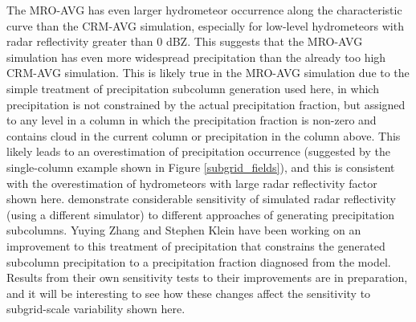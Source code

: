 \documentclass[letter]{article}
\begin{document}
The MRO-AVG has even larger hydrometeor occurrence along the characteristic curve than the CRM-AVG simulation, especially for low-level hydrometeors with radar reflectivity greater than $0$ dBZ. This suggests that the MRO-AVG simulation has even more widespread precipitation than the already too high CRM-AVG simulation. This is likely true in the MRO-AVG simulation due to the simple treatment of precipitation subcolumn generation used here, in which precipitation is not constrained by the actual precipitation fraction, but assigned to any level in a column in which the precipitation fraction is non-zero and contains cloud in the current column or precipitation in the column above. This likely leads to an overestimation of precipitation occurrence (suggested by the single-column example shown in Figure \ref{subgrid_fields}), and this is consistent with the overestimation of hydrometeors with large radar reflectivity factor shown here. \cite{dimichele_et_al_2012} demonstrate considerable sensitivity of simulated radar reflectivity (using a different simulator) to different approaches of generating precipitation subcolumns. Yuying Zhang and Stephen Klein have been working on an improvement to this treatment of precipitation that constrains the generated subcolumn precipitation to a precipitation fraction diagnosed from the model. Results from their own sensitivity tests to their improvements are in preparation, and it will be interesting to see how these changes affect the sensitivity to subgrid-scale variability shown here. 

\end{document}
